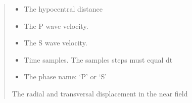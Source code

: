 \documentclass[letterpaper,10pt,english]{sphinxmanual}
\begin{document}
\begin{fulllineitems}
\begin{fulllineitems}
\begin{quote}
\begin{description}
\begin{itemize}
\item {} 
\sphinxAtStartPar
{} \textendash{} The hypocentral distance

\item {} 
\sphinxAtStartPar
{} \textendash{} The P wave velocity.

\item {} 
\sphinxAtStartPar
{} \textendash{} The S wave velocity.

\item {} 
\sphinxAtStartPar
{} \textendash{} Time samples. The samples steps must equal dt

\item {} 
\sphinxAtStartPar
{} \textendash{} The phase name: ‘P’ or ‘S’

\end{itemize}

\sphinxAtStartPar
The radial and transversal displacement in the near field

\end{description}\end{quote}

\end{fulllineitems}



\end{fulllineitems}
\end{document}
